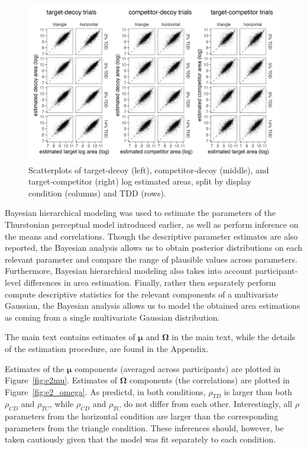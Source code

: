 \begin{figure}
   \includegraphics[width=\textwidth]{figures/circleAreaPhase_cor_plot_all_no_outliers.jpg}
   \caption{Scatterplots of target-decoy (left), competitor-decoy (middle), and target-competitor (right) log estimated areas, split by display condition (columns) and TDD (rows).}
   \label{fig:raw_cors}
\end{figure}

Bayesian hierarchical modeling was used to estimate the parameters of the Thurstonian perceptual model introduced earlier, as well as perform inference on the means and correlations. Though the descriptive parameter estimates are also reported, the Bayesian analysis allows us to obtain posterior distributions on each relevant parameter and compare the range of plausible values across parameters. Furthermore, Bayesian hierarchical modeling also takes into account participant-level differences in area estimation. Finally, rather then separately perform compute descriptive statistics for the relevant components of a multivariate Gaussian, the Bayesian analysis allows us to model the obtained area estimations as coming from a single multivariate Gaussian distribution.

The main text contains estimates of $\boldsymbol{\mu}$ and $\boldsymbol{\Omega}$ in the main text, while the details of the estimation procedure, are found in the Appendix.

Estimates of the $\boldsymbol{\mu}$ components (averaged across participants) are plotted in Figure~\ref{fig:e2mu}. Estimates of $\boldsymbol{\Omega}$ components (the correlations) are plotted in Figure~\ref{fig:e2_omega}. As predictd, in both conditions, $\rho_{TD}$ is larger than both $\rho_{CD}$ and $\rho_{TC}$, while $\rho_{CD}$ and $\rho_{TC}$ do not differ from each other. Interestingly, all $\rho$ parameters from the horizontal condition are larger than the corresponding parameters from the triangle condition. These inferences should, however, be taken cautiously given that the model was fit separately to each condition. 

